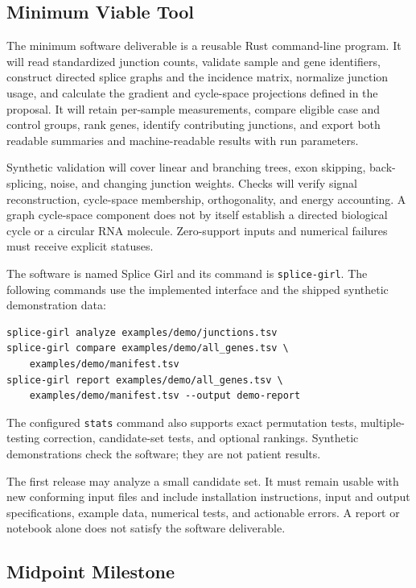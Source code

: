 \subsection{Minimum Viable Tool}

The minimum software deliverable is a reusable Rust command-line program. It
will read standardized junction counts, validate sample and gene identifiers,
construct directed splice graphs and the incidence matrix, normalize junction
usage, and calculate the gradient and cycle-space projections defined in the
proposal. It will retain per-sample measurements, compare eligible case and
control groups, rank genes, identify contributing junctions, and export both
readable summaries and machine-readable results with run parameters.

Synthetic validation will cover linear and branching trees, exon skipping,
back-splicing, noise, and changing junction weights. Checks will verify signal
reconstruction, cycle-space membership, orthogonality, and energy accounting.
A graph cycle-space component does not by itself establish a directed biological
cycle or a circular RNA molecule. Zero-support inputs and numerical failures
must receive explicit statuses.

The software is named Splice Girl and its command is \texttt{splice-girl}.
The following commands use the implemented interface and the shipped
synthetic demonstration data:
\begin{verbatim}
splice-girl analyze examples/demo/junctions.tsv
splice-girl compare examples/demo/all_genes.tsv \
    examples/demo/manifest.tsv
splice-girl report examples/demo/all_genes.tsv \
    examples/demo/manifest.tsv --output demo-report
\end{verbatim}

The configured \texttt{stats} command also supports exact permutation tests,
multiple-testing correction, candidate-set tests, and optional rankings.
Synthetic demonstrations check the software; they are not patient results.

The first release may analyze a small candidate set. It must remain usable with
new conforming input files and include installation instructions, input and
output specifications, example data, numerical tests, and actionable errors.
A report or notebook alone does not satisfy the software deliverable.

\subsection{Midpoint Milestone}

